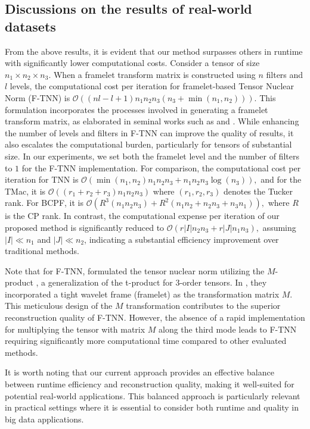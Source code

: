 \documentclass[twoside,12pt]{article}
\begin{document}
\subsection{Discussions on the results of real-world datasets}
 From the above results,  it is evident that our method surpasses others in runtime   with significantly lower computational costs. Consider a tensor of size \(n_1 \times n_2 \times n_3\). When a framelet transform matrix is constructed using \(n\) filters and \(l\) levels, the computational cost per iteration for framelet-based Tensor Nuclear Norm (F-TNN) is $\mathcal{O}((nl-l+1)n_1n_2n_3(n_3 + \min(n_1, n_2)))$. This formulation incorporates the processes involved in generating a framelet transform matrix, as elaborated in seminal works such as  \cite{cai2008framelet} and   \cite{jiang2018matrix}. While enhancing the number of levels and filters in F-TNN can improve the quality of results, it also escalates the computational burden, particularly for tensors of substantial size. In our experiments, we set both the framelet level and the number of filters to $1$ for the F-TNN implementation.
For comparison, the computational cost per iteration for TNN is
\(
\mathcal{O}(\min(n_1, n_2)n_1n_2n_3 + n_1n_2n_3\log(n_3)),
\)
and for the TMac, it is
\(
\mathcal{O}((r_1+r_2+r_3)n_{1}n_{2}n_{3})
\)
where \((r_1, r_2, r_3)\) denotes the Tucker rank. For BCPF, it is 
\(
\mathcal{O}(R^3(n_{1}n_{2}n_{3})+R^2(n_{1}n_{2}+n_{2}n_{3}+n_{3}n_{1})),
\)
where $R$ is the CP rank. In contrast, the computational expense per iteration of our proposed method is significantly reduced to
\(
\mathcal{O}(r|I|n_2n_3 + r|J|n_1n_3),
\)
assuming \(|I| \ll n_1\) and \(|J| \ll n_2\), indicating a substantial efficiency improvement over traditional methods.
  
Note that for F-TNN,  \cite{jiang2020framelet} formulated the tensor nuclear norm utilizing the $M$-product \citep{kilmer2019tensor}, a generalization of the t-product for 3-order tensors. In \citep{jiang2020framelet}, they  incorporated a tight wavelet frame (framelet) as the transformation matrix \(M\). This meticulous design of the $M$ transformation contributes to the superior reconstruction quality of F-TNN. However, the absence of a rapid implementation for multiplying the tensor with matrix \(M\) along the third mode leads to F-TNN requiring significantly more computational time compared to other evaluated methods.
 

It is worth noting that our current approach provides an effective balance between runtime efficiency and reconstruction quality, making it well-suited for potential real-world applications. This balanced approach is particularly relevant in practical settings where it is essential to consider both runtime and quality in big data applications.
\vspace{-5mm}
\end{document}
